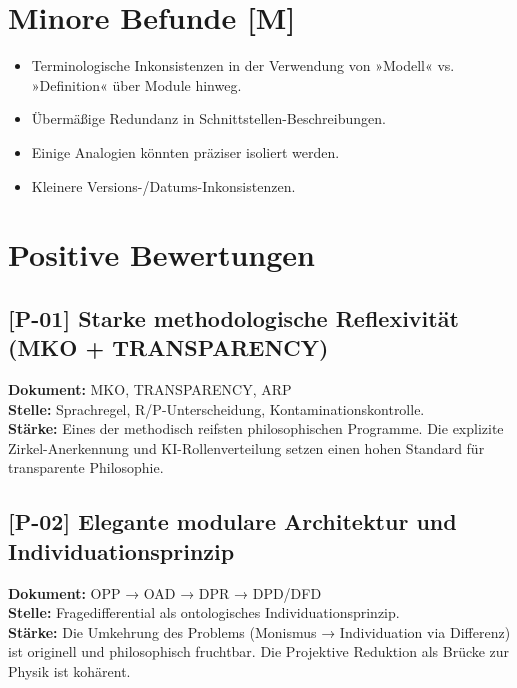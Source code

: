 \documentclass[11pt,a4paper]{article}
\begin{document}
\section*{Minore Befunde [M]}
\begin{itemize}
  \item Terminologische Inkonsistenzen in der Verwendung von »Modell« vs. »Definition« über Module hinweg.
  \item Übermäßige Redundanz in Schnittstellen-Beschreibungen.
  \item Einige Analogien könnten präziser isoliert werden.
  \item Kleinere Versions-/Datums-Inkonsistenzen.
\end{itemize}

\section*{Positive Bewertungen}

\subsection*{[P-01] Starke methodologische Reflexivität (MKO + TRANSPARENCY)}
\textbf{Dokument:} MKO, TRANSPARENCY, ARP\\
\textbf{Stelle:} Sprachregel, R/P-Unterscheidung, Kontaminationskontrolle.\\
\textbf{Stärke:} Eines der methodisch reifsten philosophischen Programme. Die explizite Zirkel-Anerkennung und KI-Rollenverteilung setzen einen hohen Standard für transparente Philosophie.

\subsection*{[P-02] Elegante modulare Architektur und Individuationsprinzip}
\textbf{Dokument:} OPP → OAD → DPR → DPD/DFD\\
\textbf{Stelle:} Fragedifferential als ontologisches Individuationsprinzip.\\
\textbf{Stärke:} Die Umkehrung des Problems (Monismus → Individuation via Differenz) ist originell und philosophisch fruchtbar. Die Projektive Reduktion als Brücke zur Physik ist kohärent.
\end{document}

